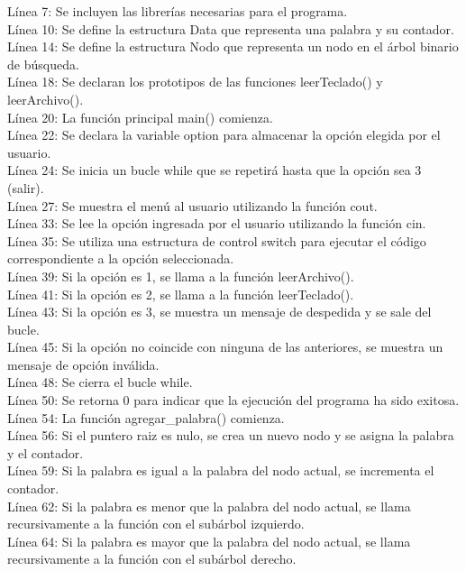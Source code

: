 \documentclass[]{article}
\begin{document}
Línea 7: Se incluyen las librerías necesarias para el programa.\\
Línea 10: Se define la estructura Data que representa una palabra y su contador.\\
Línea 14: Se define la estructura Nodo que representa un nodo en el árbol binario de búsqueda.\\
Línea 18: Se declaran los prototipos de las funciones leerTeclado() y leerArchivo().\\
Línea 20: La función principal main() comienza.\\
Línea 22: Se declara la variable option para almacenar la opción elegida por el usuario.\\
Línea 24: Se inicia un bucle while que se repetirá hasta que la opción sea 3 (salir).\\
Línea 27: Se muestra el menú al usuario utilizando la función cout.\\
Línea 33: Se lee la opción ingresada por el usuario utilizando la función cin.\\
Línea 35: Se utiliza una estructura de control switch para ejecutar el código correspondiente a la opción seleccionada.\\
Línea 39: Si la opción es 1, se llama a la función leerArchivo().\\
Línea 41: Si la opción es 2, se llama a la función leerTeclado().\\
Línea 43: Si la opción es 3, se muestra un mensaje de despedida y se sale del bucle.\\
Línea 45: Si la opción no coincide con ninguna de las anteriores, se muestra un mensaje de opción inválida.\\
Línea 48: Se cierra el bucle while.\\
Línea 50: Se retorna 0 para indicar que la ejecución del programa ha sido exitosa.\\
Línea 54: La función agregar\_palabra() comienza.\\
Línea 56: Si el puntero raiz es nulo, se crea un nuevo nodo y se asigna la palabra y el contador.\\
Línea 59: Si la palabra es igual a la palabra del nodo actual, se incrementa el contador.\\
Línea 62: Si la palabra es menor que la palabra del nodo actual, se llama recursivamente a la función con el subárbol izquierdo.\\
Línea 64: Si la palabra es mayor que la palabra del nodo actual, se llama recursivamente a la función con el subárbol derecho.\\
\end{document}
